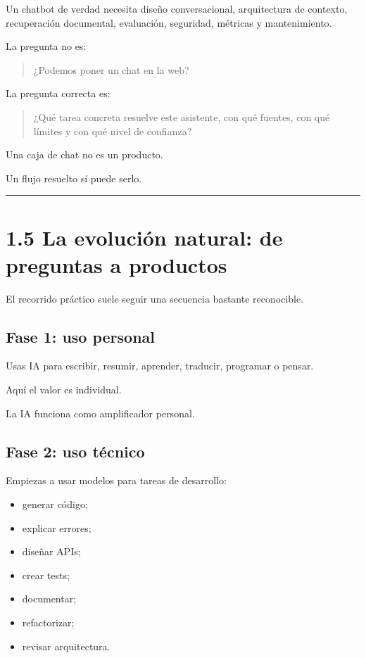 Un chatbot de verdad necesita diseño conversacional, arquitectura de
contexto, recuperación documental, evaluación, seguridad, métricas y
mantenimiento.

La pregunta no es:

\begin{quote}
¿Podemos poner un chat en la web?
\end{quote}

La pregunta correcta es:

\begin{quote}
¿Qué tarea concreta resuelve este asistente, con qué fuentes, con qué
límites y con qué nivel de confianza?
\end{quote}

Una caja de chat no es un producto.

Un flujo resuelto sí puede serlo.

\begin{center}\rule{0.5\linewidth}{0.5pt}\end{center}

\section{1.5 La evolución natural: de preguntas a
productos}\label{la-evoluciuxf3n-natural-de-preguntas-a-productos}

El recorrido práctico suele seguir una secuencia bastante reconocible.

\subsection{Fase 1: uso personal}\label{fase-1-uso-personal}

Usas IA para escribir, resumir, aprender, traducir, programar o pensar.

Aquí el valor es individual.

La IA funciona como amplificador personal.

\subsection{Fase 2: uso técnico}\label{fase-2-uso-tuxe9cnico}

Empiezas a usar modelos para tareas de desarrollo:

\begin{itemize}
\tightlist
\item
  generar código;
\item
  explicar errores;
\item
  diseñar APIs;
\item
  crear tests;
\item
  documentar;
\item
  refactorizar;
\item
  revisar arquitectura.
\end{itemize}

